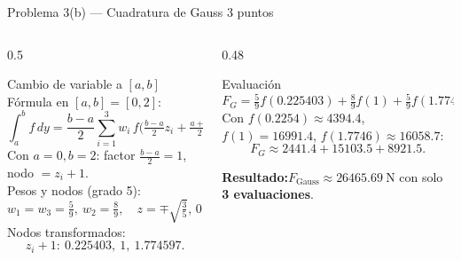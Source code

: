 \documentclass[aspectratio=169,10pt]{beamer}
\begin{document}
\begin{frame}{Problema 3(b) — Cuadratura de Gauss 3 puntos}
\begin{columns}[T]
\begin{column}{0.5\textwidth}
\begin{cardgear}{Cambio de variable a $[a,b]$}{\faSuperscript}
{\footnotesize Fórmula en $[a,b]=[0,2]$:
\[
\int_a^b f\,dy=\frac{b-a}{2}\sum_{i=1}^3 w_i\,f\!\Big(\tfrac{b-a}{2}z_i+\tfrac{a+b}{2}\Big).
\]
Con $a=0,b=2$: factor $\tfrac{b-a}{2}=1$, nodo $=z_i+1$.\\[0.8mm]
Pesos y nodos (grado 5):
\[
w_1=w_3=\tfrac59,\ w_2=\tfrac89,\quad z=\mp\sqrt{\tfrac35},\,0.
\]
Nodos transformados:
\[
z_i+1:\ 0.225403,\ 1,\ 1.774597.
\]}
\end{cardgear}
\end{column}
\begin{column}{0.48\textwidth}
\begin{cardgear}{Evaluación}{\faCalculator}
{\footnotesize
\[
F_G=\tfrac59 f(0.225403)+\tfrac89 f(1)+\tfrac59 f(1.774597).
\]
Con $f(0.2254)\approx4394.4$, $f(1)=16991.4$, $f(1.7746)\approx16058.7$:
\[
F_G\approx2441.4+15103.5+8921.5.
\]}
\end{cardgear}
\vspace{1mm}
\begin{cardnota}[\faCheckCircle]
{\footnotesize \textbf{Resultado:}\quad $F_{\text{Gauss}}\approx 26465.69\ \text{N}$ con solo \textbf{3 evaluaciones}.}
\end{cardnota}
\end{column}
\end{columns}
\end{frame}
\end{document}
